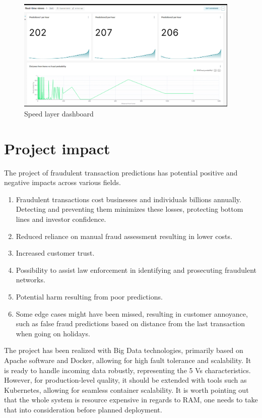 \documentclass[12pt,a4paper, hidelinks]{article}
\begin{document}
\begin{figure}[H]
    \centering
    \includegraphics[width=0.95\textwidth]{images/superset-2.png}
    \caption{Speed layer dashboard}
    \label{fig:speed-dashboard}
\end{figure}

\section{Project impact}
The project of fraudulent transaction predictions has potential positive and negative impacts across various fields.
\begin{enumerate}
    \item Fraudulent transactions cost businesses and individuals billions annually. Detecting and preventing them minimizes these losses, protecting bottom lines and investor confidence.
    \item Reduced reliance on manual fraud assessment resulting in lower costs.
    \item Increased customer trust.
    \item Possibility to assist law enforcement in identifying and prosecuting fraudulent networks.
    \item Potential harm resulting from poor predictions.
    \item Some edge cases might have been missed, resulting in customer annoyance, such as false fraud predictions based on distance from the last transaction when going on holidays.
\end{enumerate}
The project has been realized with Big Data technologies, primarily based on Apache software and Docker, allowing for high fault tolerance and scalability. It is ready to handle incoming data robustly, representing the 5 Vs characteristics. However, for production-level quality, it should be extended with tools such as Kubernetes, allowing for seamless container scalability. It is worth pointing out that the whole system is resource expensive in regards to RAM, one needs to take that into consideration before planned deployment.
\end{document}
